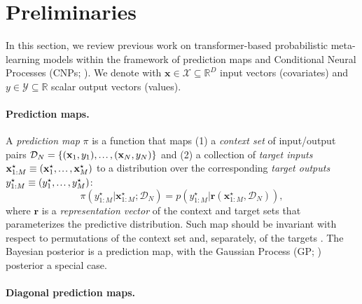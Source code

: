 \documentclass[twoside]{article}
\renewcommand{\r}{\mathbf{r}}
\renewcommand{\ldots}{\mathinner{.\mkern1.5mu.\mkern1.5mu.}}
\newcommand{\x}{\mathbf{x}}
\newcommand{\y}{\mathbf{y}}
\newcommand{\data}{\mathcal{D}}
\newcommand{\xt}{\mathbf{x}^\star}
\newcommand{\yt}{{y}^\star}
\newcommand{\XX}{\mathcal{X}}
\newcommand{\YY}{\mathcal{Y}}
\begin{document}
\section{Preliminaries}
\label{sec:preliminaries}

\vspace{-0.25em}
In this section, we review previous work on transformer-based probabilistic meta-learning models within the framework of prediction maps \citep{foong2020meta, markou2022practical} and Conditional Neural Processes (CNPs; \citealp{garnelo2018conditional}).
We denote with $\x \in \XX \subseteq \mathbb{R}^{D}$ input vectors (covariates) and $y \in \YY \subseteq \mathbb{R}$ scalar output vectors (values). %

\vspace{-0.25em}
\paragraph{Prediction maps.}

A \emph{prediction map} $\pi$ is a function that maps (1) a \emph{context set} of input/output pairs $\data_N = \{(\x_1, y_1), \ldots, (\x_N, y_N)\}$ and (2) a collection of \emph{target inputs} $\xt_{1:M} \equiv (\xt_1, \ldots, \xt_M)$ to a distribution over the corresponding \emph{target outputs} $\yt_{1:M} \equiv (\yt_{1}, \ldots, \yt_M)$: 
\begin{equation} 
\label{eq:predictionmap}
 \pi\left(\yt_{1:M} \vert \xt_{1:M}; \data_N \right) = %
p\left(\yt_{1:M}| \r(\xt_{1:M}, \data_N) \right), 
\end{equation}
where $\r$ is a \emph{representation vector} of the context and target sets that parameterizes the predictive distribution. 
Such map should be invariant with respect to permutations of the context set and, separately, of the targets \citep{foong2020meta}. 
The Bayesian posterior is a prediction map, with the Gaussian Process (GP; \citealp{rasmussen2006gaussian}) posterior a special case.

\vspace{-0.25em}
\paragraph{Diagonal prediction maps.}
\end{document}
